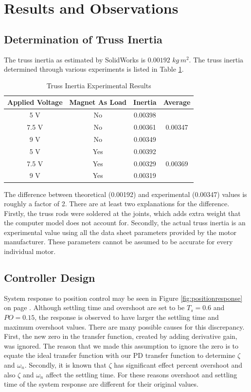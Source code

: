 \section{Results and Observations}

\subsection{Determination of Truss Inertia}

The truss inertia as estimated by SolidWorks is $0.00192 \,\,kg\,m^2$.
The truss inertia determined through various experiments is listed in Table \ref{tbl:inertia}.

\begin{table}[htb]
	\centering
	\caption{Truss Inertia Experimental Results}
	\label{tbl:inertia}
	\vspace{6pt}
	\footnotesize
	\begin{tabular}{cccc}
		\toprule
		Applied Voltage & Magnet As Load & Inertia & Average \\
		\midrule
		5 V & No & 0.00398  \\
		7.5 V & No & 0.00361& 0.00347 \\
		9 V & No & 0.00349 \\
		\midrule
		5 V & Yes & 0.00392 \\
		7.5 V & Yes & 0.00329 & 0.00369\\
		9 V & Yes & 0.00319 \\
		\bottomrule
	\end{tabular}
\end{table}

The difference between theoretical  (0.00192) and experimental (0.00347) values is roughly a factor of 2. 
There are at least two explanations for the difference. 
Firstly, the truss rods were soldered at the joints, which adds extra weight that the computer model does not account for. 
Secondly, the actual truss inertia is an experimental value using all the data sheet parameters provided by the motor manufacturer. These parameters cannot be assumed to be accurate for every individual motor. 

\subsection{Controller Design}

System response to position control may be seen in Figure \ref{fig:positionresponse} on page \pageref{fig:positionresponse}.
Although settling time and overshoot are set to be $T_s = 0.6$ and $PO = 0.15$, the response is observed to have larger the settling time and maximum overshoot values.
There are many possible causes for this discrepancy.  
First, the new zero in the transfer function, created by adding derivative gain, was ignored. 
The reason that we made this assumption to ignore the zero is to equate the ideal transfer function with our PD transfer function to determine $\zeta$ and $\omega_n$. 
Secondly, it is known that $\zeta$ has significant effect percent overshoot and also $\zeta$ and $\omega_n$ affect the settling time.
For these reasons overshoot and settling time of the system response are different for their original values.

